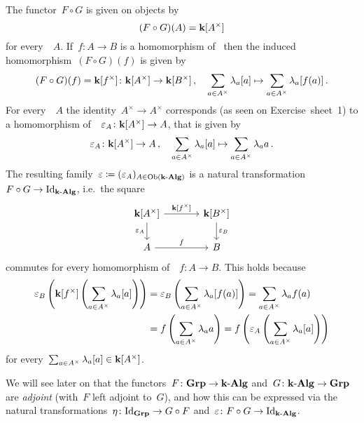 \begin{example}
  The functor~$F \circ G$ is given on objects by
  \[
      (F \circ G)(A)
    = \mathbf{k}[A^\times]
  \]
  for every~{\kalg}~$A$.
  If~$f \colon A \to B$ is a homomorphism of~{\kalgs} then the induced~{\kalg} homomorphism~$(F \circ G)(f)$ is given by
  \[
            (F \circ G)(f)
    =       \mathbf{k}[f^\times]
    \colon  \mathbf{k}[A^\times]
    \to     \mathbf{k}[B^\times] \,,
    \quad   \sum_{a \in A^\times} \lambda_a [a]
    \mapsto \sum_{a \in A^\times} \lambda_a [f(a)] \,.
  \]
  For every~{\kalg}~$A$ the identity~$A^\times \to A^\times$ corresponds (as seen on Exercise~sheet~1) to a homomorphism of~{\kalg}~$\varepsilon_A \colon \mathbf{k}[A^\times] \to A$, that is given by
  \[
            \varepsilon_A
    \colon  \mathbf{k}[A^\times]
    \to     A \,,
    \quad   \sum_{a \in A^\times} \lambda_a [a]
    \mapsto \sum_{a \in A^\times} \lambda_a a \,.
  \]
  The resulting family~$\varepsilon \coloneqq (\varepsilon_A)_{A \in \operatorname{Ob}(\text{$\mathbf{k}$-$\mathbf{Alg}$})}$ is a natural transformation~$F \circ G \to \mathrm{Id}_{\text{$\mathbf{k}$-$\mathbf{Alg}$}}$, i.e.\ the square
  \[
    \begin{tikzcd}[column sep = large]
        \kf[A^\times]
        \arrow{r}[above]{\kf[f^\times]}
        \arrow{d}[left]{\varepsilon_A}
      & \kf[B^\times]
        \arrow{d}[right]{\varepsilon_B}
      \\
        A
        \arrow{r}[above]{f}
      & B
    \end{tikzcd}
  \]
  commutes for every homomorphism of~{\kalgs}~$f \colon A \to B$.
  This holds because
  \begin{align*}
        \varepsilon_B\left( \mathbf{k}[f^\times]\left( \sum_{a \in A^\times} \lambda_a [a] \right) \right)
    &=  \varepsilon_B\left( \sum_{a \in A^\times} \lambda_a [f(a)] \right)
     =  \sum_{a \in A^\times} \lambda_a f(a)  \\
    &=  f\left( \sum_{a \in A^\times} \lambda_a a \right)
     =  f\left( \varepsilon_A\left( \sum_{a \in A^\times} \lambda_a [a] \right) \right)
  \end{align*}
  for every~$\sum_{a \in A^\times} \lambda_a [a] \in \mathbf{k}[A^\times]$.
  
  We will see later on that the functors~$F \colon \mathbf{Grp} \to \text{$\mathbf{k}$-$\mathbf{Alg}$}$ and~$G \colon \text{$\mathbf{k}$-$\mathbf{Alg}$} \to \mathbf{Grp}$ are \emph{adjoint} (with~$F$ left adjoint to~$G$), and how this can be expressed via the natural transformations~$\eta \colon \mathrm{Id}_{\mathbf{Grp}} \to G \circ F$ and~$\varepsilon \colon F \circ G \to \mathrm{Id}_{\text{$\mathbf{k}$-$\mathbf{Alg}$}}$.
\end{example}





